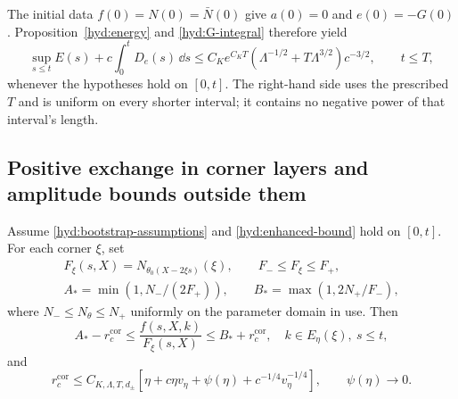 The initial data $f(0)=N(0)=\bar N(0)$ give $a(0)=0$ and $e(0)=-G(0)$.
Proposition~\ref{hyd:energy} and \eqref{hyd:G-integral} therefore yield
\begin{equation}\label{hyd:enhanced-bound}
 \sup_{s\le t}E(s)+c\int_0^tD_e(s)\,\dd s
 \le C_K e^{C_KT}(\Lambda^{-1/2}+T\Lambda^{3/2})c^{-3/2},
 \qquad t\le T,
\end{equation}
whenever the hypotheses hold on $[0,t]$. The right-hand side uses the
prescribed $T$ and is uniform on every shorter interval; it contains no
negative power of that interval's length.

\subsection{Positive exchange in corner layers and amplitude bounds outside them}
\label{hyd:corner-section}

\begin{lemma}\label{hyd:corner}
 Assume \eqref{hyd:bootstrap-assumptions} and
 \eqref{hyd:enhanced-bound} hold on $[0,t]$. For each corner $\xi$, set
 \begin{gather*}
 F_\xi(s,X)=N_{\theta_0(X-2\xi s)}(\xi),\qquad
 F_-\le F_\xi\le F_+,\\
 A_* =\min(1,N_-/(2F_+)),\qquad
 B_* =\max(1,2N_+/F_-),
 \end{gather*}
 where $N_-\le N_\theta\le N_+$ uniformly on the parameter domain in use.
 Then
 \begin{equation}\label{hyd:corner-barrier}
 A_*-r_c^{\mathrm{cor}}\le\frac{f(s,X,k)}{F_\xi(s,X)}\le B_*+r_c^{\mathrm{cor}},
 \quad k\in E_\eta(\xi),\ s\le t,
 \end{equation}
 and
 \begin{equation}\label{hyd:corner-remainder}
 r_c^{\mathrm{cor}}\le C_{K,\Lambda,T,d_\pm}
     [\eta+c\eta v_\eta+\psi(\eta)+c^{-1/4}v_\eta^{-1/4}],
 \qquad\psi(\eta)\longrightarrow0.
 \end{equation}
\end{lemma}

